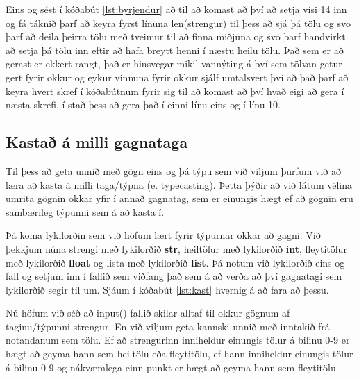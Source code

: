Eins og sést í kóðabút \ref{lst:byrjendur} að til að komast að því að setja vísi 14 inn og fá táknið þarf að keyra fyrst línuna len(strengur) til þess að sjá þá tölu og svo þarf að deila þeirra tölu með tveimur til að finna miðjuna og svo þarf handvirkt að setja þá tölu inn eftir að hafa breytt henni í næstu heilu tölu.
Það sem er að gerast er ekkert rangt, það er hinsvegar mikil vannýting á því sem tölvan getur gert fyrir okkur og eykur vinnuna fyrir okkur sjálf umtalsvert því að það þarf að keyra hvert skref í kóðabútnum fyrir sig til að komast að því hvað eigi að gera í næsta skrefi, í stað þess að gera það í einni línu eins og í línu 10.

\subsection{Kastað á milli gagnataga}
Til þess að geta unnið með gögn eins og þá týpu sem við viljum þurfum við að læra að kasta á milli taga/týpna (e. typecasting).
Þetta þýðir að við látum vélina umrita gögnin okkar yfir í annað gagnatag, sem er einungis hægt ef að gögnin eru sambærileg týpunni sem á að kasta í.

Þá koma lykilorðin sem við höfum lært fyrir týpurnar okkar að gagni.
Við þekkjum núna strengi með lykilorðið \textbf{str}, heiltölur með lykilorðið \textbf{int}, fleytitölur með lykilorðið \textbf{float} og lista með lykilorðið \textbf{list}.
Þá notum við lykilorðið eins og fall og setjum inn í fallið sem viðfang það sem á að verða að því gagnatagi sem lykilorðið segir til um.
Sjáum í kóðabút \ref{lst:kast} hvernig á að fara að þessu.

Nú höfum við séð að input() fallið skilar alltaf til okkur gögnum af taginu/týpunni strengur.
En við viljum geta kannski unnið með inntakið frá notandanum sem tölu.
Ef að strengurinn inniheldur einungis tölur á bilinu 0-9 er hægt að geyma hann sem heiltölu eða fleytitölu, ef hann inniheldur einungis tölur á bilinu 0-9 og nákvæmlega einn punkt er hægt að geyma hann sem fleytitölu.



